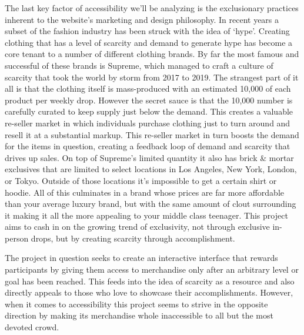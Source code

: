 \documentclass[10pt,twocolumn]{article}
\begin{document}
The last key factor of accessibility we’ll be analyzing is the exclusionary practices inherent to the website’s marketing and design philosophy. In recent years a subset of the fashion industry has been struck with the idea of ‘hype’. Creating clothing that has a level of scarcity and demand to generate hype has become a core tenant to a number of different clothing brands. By far the most famous and successful of these brands is Supreme, which managed to craft a culture of scarcity that took the world by storm from 2017 to 2019. The strangest part of it all is that the clothing itself is mass-produced with an estimated 10,000 of each product per weekly drop. However the secret sauce is that the 10,000 number is carefully curated to keep supply just below the demand. This creates a valuable re-seller market in which individuals purchase clothing just to turn around and resell it at a substantial markup. This re-seller market in turn boosts the demand for the items in question, creating a feedback loop of demand and scarcity that drives up sales. On top of Supreme’s limited quantity it also has brick & mortar exclusives that are limited to select locations in Los Angeles, New York, London, or Tokyo. Outside of those locations it’s impossible to get a certain shirt or hoodie. All of this culminates in a brand whose prices are far more affordable than your average luxury brand, but with the same amount of clout surrounding it making it all the more appealing to your middle class teenager. This project aims to cash in on the growing trend of exclusivity, not through exclusive in-person drops, but by creating scarcity through accomplishment. 

The project in question seeks to create an interactive interface that rewards participants by giving them access to merchandise only after an arbitrary level or goal has been reached. This feeds into the idea of scarcity as a resource and also directly appeals to those who love to showcase their accomplishments. However, when it comes to accessibility this project seems to strive in the opposite direction by making its merchandise whole inaccessible to all but the most devoted crowd. 
\end{document}
